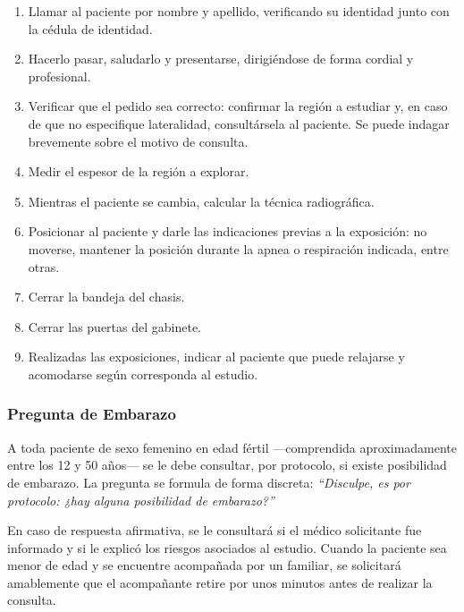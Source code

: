 \begin{enumerate}
    \item Llamar al paciente por nombre y apellido, verificando su identidad
    junto con la cédula de identidad.

    \item Hacerlo pasar, saludarlo y presentarse, dirigiéndose de forma cordial
    y profesional.

    \item Verificar que el pedido sea correcto: confirmar la región a estudiar y,
    en caso de que no especifique lateralidad, consultársela al paciente. Se puede
    indagar brevemente sobre el motivo de consulta.

    \item Medir el espesor de la región a explorar.

    \item Mientras el paciente se cambia, calcular la técnica radiográfica.

    \item Posicionar al paciente y darle las indicaciones previas a la exposición:
    no moverse, mantener la posición durante la apnea o respiración indicada, entre
    otras.

    \item Cerrar la bandeja del chasis.

    \item Cerrar las puertas del gabinete.

    \item Realizadas las exposiciones, indicar al paciente que puede relajarse y
    acomodarse según corresponda al estudio.
\end{enumerate}

\subsubsection*{Pregunta de Embarazo}

A toda paciente de sexo femenino en edad fértil ---comprendida aproximadamente
entre los 12 y 50 años--- se le debe consultar, por protocolo, si existe posibilidad
de embarazo. La pregunta se formula de forma discreta: \textit{``Disculpe, es por
protocolo: ¿hay alguna posibilidad de embarazo?''}

En caso de respuesta afirmativa, se le consultará si el médico solicitante fue
informado y si le explicó los riesgos asociados al estudio. Cuando la paciente
sea menor de edad y se encuentre acompañada por un familiar, se solicitará
amablemente que el acompañante retire por unos minutos antes de realizar la consulta.

